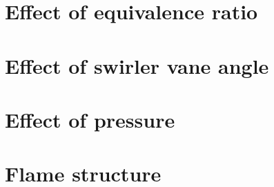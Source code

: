 \section{Effect of equivalence ratio}

\section{Effect of swirler vane angle}

\section{Effect of pressure}

\section{Flame structure}


